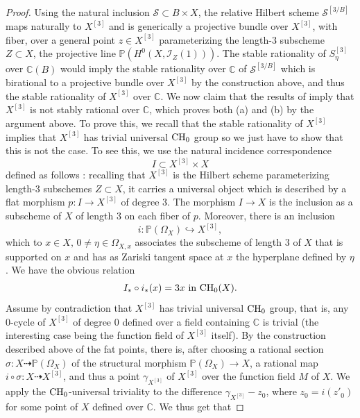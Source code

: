 \documentclass[10pt]{article}
\begin{document}
\begin{proof} Using the natural inclusion $\mathcal{S}\subset B\times X$, the relative Hilbert scheme $\mathcal{S}^{[3/B]}$ maps naturally to $X^{[3]}$ and is generically a projective bundle over $X^{[3]}$, with fiber, over a general point $z\in X^{[3]}$ parameterizing the length-$3$ subscheme $Z\subset X$, the projective line $\mathbb{P}(H^0(X,\mathcal{I}_Z(1)))$. The stable rationality of $S_\eta^{[3]}$ over $\mathbb{C}(B)$ would imply the stable rationality over $\mathbb{C}$ of $\mathcal{S}^{[3/B]}$ which is birational to a projective bundle over $X^{[3]}$ by the  construction above, and thus the stable rationality of $X^{[3]}$ over $\mathbb{C}$. We now claim that  the results of \cite{SEggay} imply that $X^{[3]}$ is not stably rational over $\mathbb{C}$, which proves both (a) and (b) by the argument above. To prove this, we recall that the stable rationality of $X^{[3]}$ implies that $X^{[3]}$ has trivial universal ${\rm CH}_0$ group so we just have to show that this is not the case.  To see this, we use the  natural incidence correspondence
$$ I\subset X^{[3]}\times X$$
defined as follows : recalling that $X^{[3]}$ is the Hilbert scheme parameterizing length-$3$ subschemes $Z\subset X$, it  carries a universal object which is described by a flat morphism $p: I\rightarrow X^{[3]}$ of degree $3$. The morphism  $I\rightarrow X$ is the inclusion as a  subscheme of $X$ of length $3$ on each fiber of $p$.
Moreover, there is  an inclusion
$$i:\mathbb{P}(\Omega_X)\hookrightarrow X^{[3]},$$
which to $x\in X,\,0\not=\eta\in \Omega_{X,x}$ associates the subscheme of length $3$ of $X$ that is supported on $x$ and has  as  Zariski tangent space at $x$ the hyperplane defined by $\eta$.
We have the obvious relation
\begin{eqnarray}\label{eqcorrespHS} I_*\circ i_*(x)=3x\,\,{\rm in}\,\,{\rm CH}_0(X).\end{eqnarray}
Assume by contradiction that $X^{[3]}$ has trivial universal ${\rm CH}_0$ group, that is, any $0$-cycle of $X^{[3]}$ of degree $0$ defined over a  field  containing $\mathbb{C}$ is trivial (the interesting case being the function field of $X^{[3]}$ itself). By the construction described above of the fat points, there is, after choosing a rational section $\sigma: X\dashrightarrow \mathbb{P}(\Omega_X)$ of the structural morphism $\mathbb{P}(\Omega_X)\rightarrow X$, a  rational map  $ i\circ \sigma: X\dashrightarrow X^{[3]}$, and thus a point $\gamma_{X^{[3]}}$ of $X^{[3]}$ over the function field $M$ of $X$. We apply the ${\rm CH}_0$-universal triviality to the difference $\gamma_{X^{[3]}}-z_0$, where $z_0=i(z'_0)$ for some  point of $X$ defined over $\mathbb{C}$.  We thus get that

\end{proof}
\end{document}
